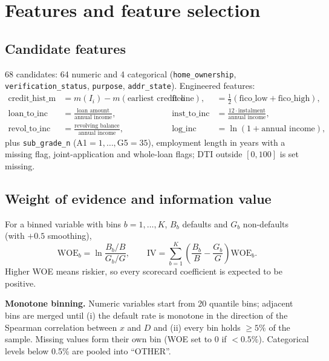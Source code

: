 \documentclass[11pt,a4paper]{article}
\newcommand{\1}{\mathbf{1}}
\begin{document}
\section{Features and feature selection}
\subsection{Candidate features}
68 candidates: 64 numeric and 4 categorical (\texttt{home\_ownership}, \texttt{verification\_status}, \texttt{purpose}, \texttt{addr\_state}). Engineered features:
\begin{align*}
\text{credit\_hist\_m}&=m(I_i)-m(\text{earliest credit line}), & \text{fico}&=\tfrac12(\text{fico\_low}+\text{fico\_high}),\\
\text{loan\_to\_inc}&=\frac{\text{loan amount}}{\text{annual income}}, & \text{inst\_to\_inc}&=\frac{12\cdot\text{instalment}}{\text{annual income}},\\
\text{revol\_to\_inc}&=\frac{\text{revolving balance}}{\text{annual income}}, & \text{log\_inc}&=\ln(1+\text{annual income}),
\end{align*}
plus \texttt{sub\_grade\_n} (A1$=1,\dots,$G5$=35$), employment length in years with a missing flag, joint-application and whole-loan flags; DTI outside $[0,100]$ is set missing.

\subsection{Weight of evidence and information value}
For a binned variable with bins $b=1,\dots,K$, $B_b$ defaults and $G_b$ non-defaults (with $+0.5$ smoothing),
\begin{equation}
\mathrm{WOE}_b=\ln\frac{B_b/B}{G_b/G},\qquad \mathrm{IV}=\sum_{b=1}^{K}\left(\frac{B_b}{B}-\frac{G_b}{G}\right)\mathrm{WOE}_b .
\end{equation}
Higher WOE means riskier, so every scorecard coefficient is expected to be positive.

\textbf{Monotone binning.} Numeric variables start from 20 quantile bins; adjacent bins are merged until (i) the default rate is monotone in the direction of the Spearman correlation between $x$ and $D$ and (ii) every bin holds $\ge5\%$ of the sample. Missing values form their own bin (WOE set to 0 if $<0.5\%$). Categorical levels below 0.5\% are pooled into ``OTHER''.
\end{document}
